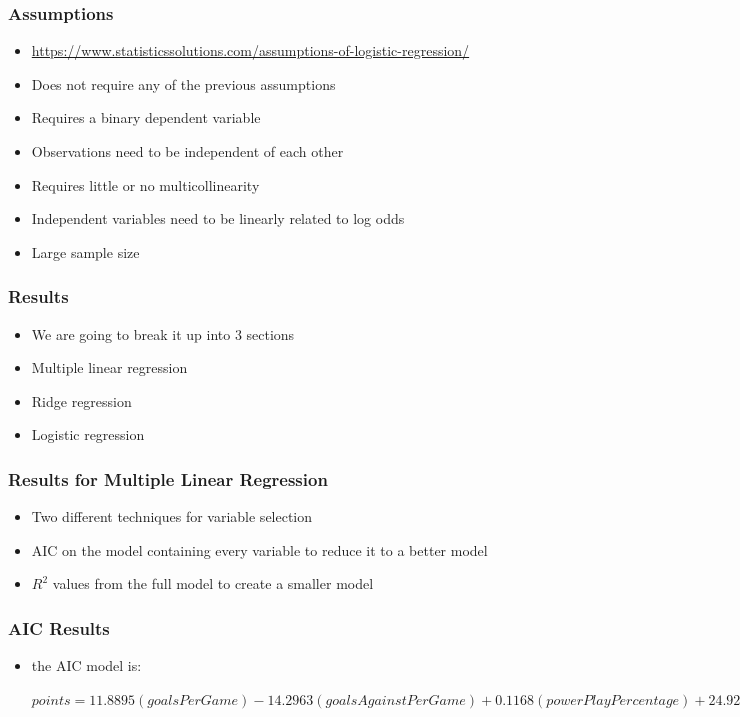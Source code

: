 \documentclass{beamer}
\begin{document}
	\begin{frame}
		\frametitle{Assumptions}
		\begin{itemize}
			\item \url{https://www.statisticssolutions.com/assumptions-of-logistic-regression/}
			\item Does not require any of the previous assumptions
			\item Requires a binary dependent variable
			\item Observations need to be independent of each other 
			\item Requires little or no multicollinearity 
			\item Independent variables need to be linearly related to log odds
			\item Large sample size
		\end{itemize}
	\end{frame}
\begin{frame}
	\frametitle{Results}
	\begin{itemize}
		\item We are going to break it up into 3 sections
		\item Multiple linear regression
		\item Ridge regression
		\item Logistic regression
	\end{itemize}
\end{frame}
\begin{frame}
\frametitle{Results for Multiple Linear Regression}
\begin{itemize}
	\item Two different techniques for variable selection
	\item AIC on the model containing every variable to reduce it to a better model 
	\item $R^2$ values from the full model to create a smaller model
\end{itemize}
\end{frame}
\begin{frame}
\frametitle{AIC Results}
\begin{itemize}
	\item the AIC model is: 
	\begin{center}$
		points = 11.8895(goalsPerGame) - 14.2963(goalsAgainstPerGame) + 0.1168(powerPlayPercentage) + 24.9296(winScoreFirst) + 26.3916(winOppScoreFirst) - 10.1651(winLeadSecondPer) + 24.6731(winOutshootOpp) + 23.2772(winOutshotByOpp) + 0.1465(faceOffWinPercentage) + 48.08239  
		$\end{center}
\end{itemize}
\end{frame}
\end{document}
